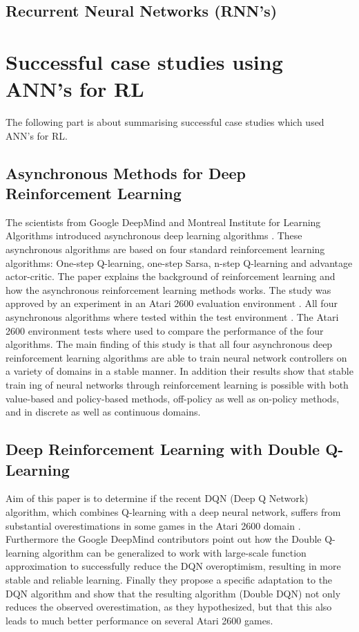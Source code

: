 \documentclass[conference]{IEEEtran}
\begin{document}
\subsection{Recurrent Neural Networks (RNN's)}


\section{Successful case studies using ANN's for RL}
The following part is about summarising successful case studies which used ANN's for RL. 

\subsection{Asynchronous Methods for Deep Reinforcement Learning}
The scientists from Google DeepMind and Montreal Institute for Learning Algorithms introduced asynchronous deep learning algorithms \cite{DBLP:journals/corr/MnihBMGLHSK16}. These asynchronous algorithms are based on four standard reinforcement learning algorithms: One-step Q-learning, one-step Sarsa, n-step Q-learning and advantage actor-critic. The paper explains the background of reinforcement learning and how the asynchronous reinforcement learning methods works. The study was approved by an experiment in an Atari 2600 evaluation environment . All four asynchronous algorithms where tested within the test environment  . The Atari 2600 environment tests where used to compare the performance of the four algorithms. The main finding of this study is that all four asynchronous deep reinforcement learning algorithms are able to train neural network controllers on a variety of domains in a stable manner. In addition their results show that stable train ing of neural networks through reinforcement learning is possible with both value-based and policy-based methods, off-policy as well as on-policy methods, and in discrete as well as continuous domains. 

\subsection{Deep Reinforcement Learning with Double Q-Learning}
Aim of this paper is to determine if the recent DQN (Deep Q Network) algorithm, which combines Q-learning with a deep neural network, suffers from substantial overestimations in some games in the Atari 2600 domain \cite{DBLP:journals/corr/HasseltGS15}. Furthermore the Google DeepMind contributors point out how the Double Q-learning algorithm can be generalized to work with large-scale function approximation to successfully reduce the DQN overoptimism, resulting in more stable and reliable learning. Finally they propose a specific adaptation to the DQN algorithm and show that the resulting algorithm (Double DQN) not only reduces the observed overestimation, as they hypothesized, but that this also leads to much better performance on several Atari 2600 games.
\end{document}
